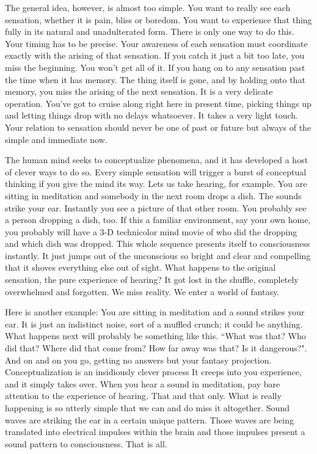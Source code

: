 The general idea, however, is almost too simple. You want to really see each
sensation, whether it is pain, bliss or boredom. You want to experience that
thing fully in its natural and unadulterated form. There is only one way to do
this. Your timing has to be precise. Your awareness of each sensation must
coordinate exactly with the arising of that sensation. If you catch it just a
bit too late, you miss the beginning. You won't get all of it. If you hang on to
any sensation past the time when it has memory. The thing itself is gone, and by
holding onto that memory, you miss the arising of the next sensation. It is a
very delicate operation.  You've got to cruise along right here in present time,
picking things up and letting things drop with no delays whatsoever. It takes a
very light touch. Your relation to sensation should never be one of past or
future but always of the simple and immediate now.

The human mind seeks to conceptualize phenomena, and it has developed a host of
clever ways to do so. Every simple sensation will trigger a burst of conceptual
thinking if you give the mind its way. Lets us take hearing, for example. You
are sitting in meditation and somebody in the next room drops a dish. The sounds
strike your ear. Instantly you see a picture of that other room. You probably
see a person dropping a dish, too. If this a familiar environment, say your own
home, you probably will have a 3-D technicolor mind movie of who did the
dropping and which dish was dropped. This whole sequence presents itself to
consciousness instantly. It just jumps out of the unconscious so bright and
clear and compelling that it shoves everything else out of sight. What happens
to the original sensation, the pure experience of hearing? It got lost in the
shuffle, completely overwhelmed and forgotten. We miss reality. We enter a world
of fantasy.

Here is another example: You are sitting in meditation and a sound strikes your
ear. It is just an indistinct noise, sort of a muffled crunch; it could be
anything. What happens next will probably be something like this. ``What was
that? Who did that? Where did that come from? How far away was that? Is it
dangerous?". And on and on you go, getting no answers but your fantasy
projection. Conceptualization is an insidiously clever process It creeps into
you experience, and it simply takes over. When you hear a sound in meditation,
pay bare attention to the experience of hearing. That and that only. What is
really happening is so utterly simple that we can and do miss it altogether.
Sound waves are striking the ear in a certain unique pattern. Those waves are
being translated into electrical impulses within the brain and those impulses
present a sound pattern to consciousness. That is all.

